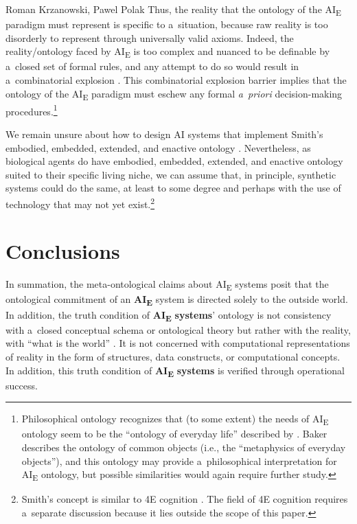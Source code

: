 \begin{artengenv2auth}{Roman Krzanowski, Pawel Polak}
Thus, the reality that the ontology of the AI\textsubscript{E} paradigm must represent is specific to a~situation, because raw reality is too disorderly to represent through universally valid axioms. Indeed, the reality/ontology faced by AI\textsubscript{E} is too complex and nuanced to be definable by a~closed set of formal rules, and any attempt to do so would result in a~combinatorial explosion
\parencite[][p.26]{inder_planning_1996}. %
 This combinatorial explosion barrier implies that the ontology of the AI\textsubscript{E} paradigm must eschew any formal \textit{a~priori} decision-making procedures.\footnote{Philosophical ontology recognizes that (to some extent) the needs of AI\textsubscript{E} ontology seem to be the ``ontology of everyday life'' described by 
\parencite[][]{baker_metaphysics_2007}. %
 Baker describes the ontology of common objects (i.e., the ``metaphysics of everyday objects''), and this ontology may provide a~philosophical interpretation for AI\textsubscript{E} ontology, but possible similarities would again require further study.}

We remain unsure about how to design AI systems that implement Smith's embodied, embedded, extended, and enactive ontology
\parencite[e.g.,][]{hoffmann_robots_2018}. %
 Nevertheless, as biological agents do have embodied, embedded, extended, and enactive ontology suited to their specific living niche, we can assume that, in principle, synthetic systems could do the same, at least to some degree and perhaps with the use of technology that may not yet exist.\footnote{Smith's concept is similar to 4E cognition 
\parencites[e.g.,][]{shapiro_embodied_2010}[][]{garvey_embodied_2011}[][]{newen_oxford_2020}. %
 The field of 4E cognition requires a~separate discussion because it lies outside the scope of this paper.}

\section*{Conclusions }
In summation, the meta-ontological claims about AI\textsubscript{E} systems posit that the ontological commitment of an \textbf{AI}\textbf{\textsubscript{E}} system is directed solely to the outside world. In addition, the truth condition of \textbf{AI}\textbf{\textsubscript{E}} \textbf{systems}' ontology is not consistency with a~closed conceptual schema or ontological theory but rather with the reality, with ``what is the world''
\parencite[][p.57]{smith_promise_2019}. %
 It is not concerned with computational representations of reality in the form of structures, data constructs, or computational concepts. In addition, this truth condition of \textbf{AI}\textbf{\textsubscript{E}} \textbf{systems} is verified through operational success.


\end{artengenv2auth}
